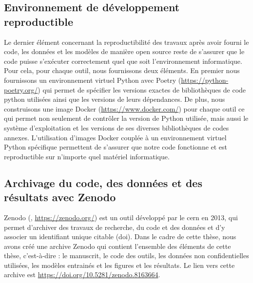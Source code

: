 \subsection{Environnement de développement reproductible}
Le dernier élément concernant la reproductibilité des travaux après avoir fourni le code, les données et les modèles de manière open source reste de s'assurer que le code puisse s'exécuter correctement quel que soit l'environnement informatique. Pour cela, pour chaque outil, nous fournissons deux éléments. En premier nous fournissons un environnement virtuel Python avec Poetry (\url{https://python-poetry.org/}) qui permet de spécifier les versions exactes de bibliothèques de code python utilisées ainsi que les versions de leurs dépendances. De plus, nous construisons une image Docker (\url{https://www.docker.com/}) pour chaque outil ce qui permet non seulement de contrôler la version de Python utilisée, mais aussi le système d'exploitation et les versions de ses diverses bibliothèques de codes annexes. L'utilisation d'images Docker couplée à un environnement virtuel Python spécifique permettent de s'assurer que notre code fonctionne et est reproductible sur n'importe quel matériel informatique.

\subsection{Archivage du code, des données et des résultats avec Zenodo}
Zenodo  (\cite{european_organization_for_nuclear_research_zenodo_2013}, \url{https://zenodo.org/}) est un outil développé par le \gls{cern} en 2013, qui permet d'archiver des travaux de recherche, du code et des données et d'y associer un identifiant unique citable (\gls{doi}). Dans le cadre de cette thèse, nous avons créé une archive Zenodo qui contient l'ensemble des éléments de cette thèse, c'est-à-dire : le manuscrit, le code des outils, les données non confidentielles utilisées, les modèles entrainés et les figures et les résultats. Le lien vers cette archive est \url{https://doi.org/10.5281/zenodo.8163664}.